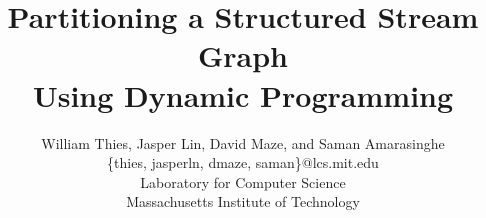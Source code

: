 \documentclass{sig-alternate}
\title{Partitioning a Structured Stream Graph \\ Using Dynamic Programming}
\author{
\alignauthor \vspace{-18pt}
William Thies,
Jasper Lin,
David Maze, and 
Saman Amarasinghe \\
	\vspace{8pt}
	\{thies, jasperln, dmaze, saman\}@lcs.mit.edu \\
	\vspace{8pt}
	Laboratory for Computer Science \\
	Massachusetts Institute of Technology}
\begin{document}
\newtheorem{definition}{Definition}
\newtheorem{transformation}{Transformation}

\maketitle

\newcommand{\mt}[1]{\mbox{\it #1}}
\newcommand{\todo}[1]{\framebox{\bf #1}}

\begin{abstract}

\end{abstract}




\begin{small}
  
  
\end{small}
\end{document}
